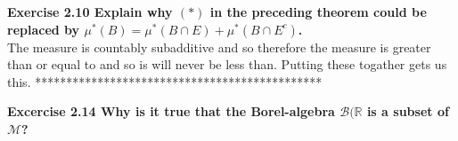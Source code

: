 \documentclass[letterpaper,12pt]{article}
\theoremstyle{definition}
\begin{document}
\vspace{5mm}

\noindent\textbf{Exercise 2.10
Explain why $(*)$ in the preceding theorem could be replaced by $\mu^*(B) = \mu^*(B \cap E) + \mu^*(B \cap E^c)$.}\\
\indent The measure is countably subadditive and so therefore the measure is greater than or equal to and so is will never be less than.  Putting these togather gets us this. **********************************************

\noindent\textbf{Excercise 2.14
Why is it true that the Borel-algebra $\mathcal{B}(\mathbb{R}$ is a subset of $\mathcal{M}$?}
\end{document}
